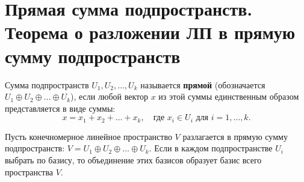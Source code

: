 \section{Прямая сумма подпространств. Теорема о разложении ЛП в прямую сумму подпространств}

\begin{definition}
Сумма подпространств $U_1, U_2, \dots, U_k$ называется \textbf{прямой} (обозначается $U_1 \oplus U_2 \oplus \dots \oplus U_k$), если любой вектор $x$ из этой суммы единственным образом представляется в виде суммы:
\[
x = x_1 + x_2 + \dots + x_k, \quad \text{где } x_i \in U_i \text{ для } i = 1, \dots, k.
\]
\end{definition}

\begin{theorem}
Пусть конечномерное линейное пространство $V$ разлагается в прямую сумму подпространств: $V = U_1 \oplus U_2 \oplus \dots \oplus U_k$. Если в каждом подпространстве $U_i$ выбрать по базису, то объединение этих базисов образует базис всего пространства $V$.
\end{theorem}


